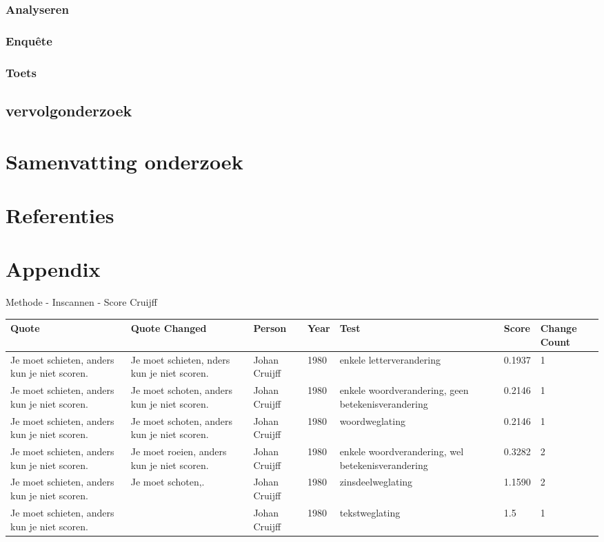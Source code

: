 \documentclass[12pt]{article}
\begin{document}
\subsubsection{Analyseren}


\subsubsection{Enquête}


\subsubsection{Toets}

\pagebreak
\subsection{vervolgonderzoek}

\section{Samenvatting onderzoek}

\section{Referenties}
\section{Appendix} %

\Large Methode - Inscannen - Score
\large Cruijff
\small
\begin{longtable}{|p{}|p{}|p{}|p{}|p{}|p{}|p{}|}
\hline
\textbf{Quote} & \textbf{Quote Changed} & \textbf{Person} & \textbf{Year} & \textbf{Test} & \textbf{Score} & \textbf{Change Count} \\
\hline
\endhead
%
\endfoot
%
Je moet schieten, anders kun je niet scoren. & Je moet schieten, nders kun je niet scoren. & Johan Cruijff & 1980 & enkele letterverandering & 0.1937 & 1 \\
\hline
Je moet schieten, anders kun je niet scoren. & Je moet schoten, anders kun je niet scoren. & Johan Cruijff & 1980 & enkele woordverandering, geen betekenisverandering & 0.2146 & 1 \\
\hline
Je moet schieten, anders kun je niet scoren. & Je moet schoten, anders kun je niet scoren. & Johan Cruijff & 1980 & woordweglating & 0.2146 & 1 \\
\hline
Je moet schieten, anders kun je niet scoren. & Je moet roeien, anders kun je niet scoren. & Johan Cruijff & 1980 & enkele woordverandering, wel betekenisverandering & 0.3282 & 2 \\
\hline
Je moet schieten, anders kun je niet scoren. & Je moet schoten,. & Johan Cruijff & 1980 & zinsdeelweglating & 1.1590 & 2 \\
\hline
Je moet schieten, anders kun je niet scoren. &  & Johan Cruijff & 1980 & tekstweglating & 1.5 & 1 \\
\hline
\end{longtable}
\end{document}
